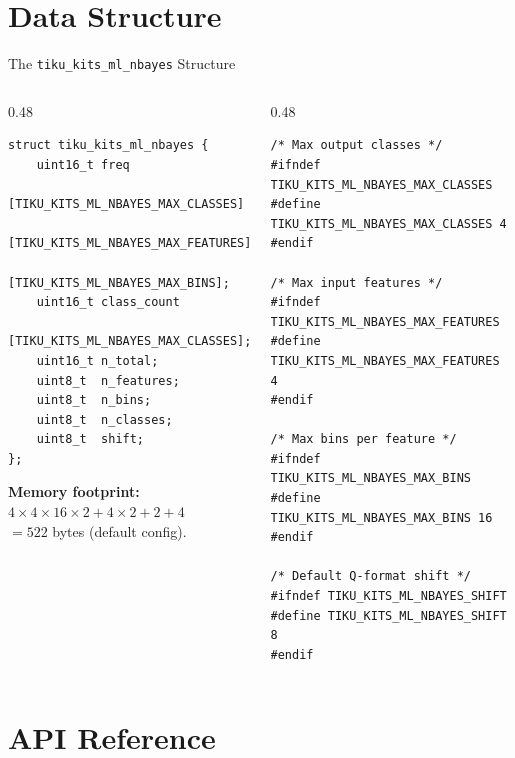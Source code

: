 \documentclass[aspectratio=169, 10pt]{beamer}
\begin{document}
\section{Data Structure}

\begin{frame}[fragile]{The \texttt{tiku\_kits\_ml\_nbayes} Structure}
\begin{columns}[T]
\begin{column}{0.48\textwidth}
\begin{lstlisting}[style=cstyle,
  title={ml/classification/tiku\_kits\_ml\_nbayes.h}]
struct tiku_kits_ml_nbayes {
    uint16_t freq
        [TIKU_KITS_ML_NBAYES_MAX_CLASSES]
        [TIKU_KITS_ML_NBAYES_MAX_FEATURES]
        [TIKU_KITS_ML_NBAYES_MAX_BINS];
    uint16_t class_count
        [TIKU_KITS_ML_NBAYES_MAX_CLASSES];
    uint16_t n_total;
    uint8_t  n_features;
    uint8_t  n_bins;
    uint8_t  n_classes;
    uint8_t  shift;
};
\end{lstlisting}

\textbf{Memory footprint:}\\
$4 \times 4 \times 16 \times 2 + 4 \times 2 + 2 + 4$\\
$= 522$ bytes (default config).
\end{column}

\begin{column}{0.48\textwidth}
\begin{lstlisting}[style=cstyle,
  title={Configuration macros}]
/* Max output classes */
#ifndef TIKU_KITS_ML_NBAYES_MAX_CLASSES
#define TIKU_KITS_ML_NBAYES_MAX_CLASSES 4
#endif

/* Max input features */
#ifndef TIKU_KITS_ML_NBAYES_MAX_FEATURES
#define TIKU_KITS_ML_NBAYES_MAX_FEATURES 4
#endif

/* Max bins per feature */
#ifndef TIKU_KITS_ML_NBAYES_MAX_BINS
#define TIKU_KITS_ML_NBAYES_MAX_BINS 16
#endif

/* Default Q-format shift */
#ifndef TIKU_KITS_ML_NBAYES_SHIFT
#define TIKU_KITS_ML_NBAYES_SHIFT 8
#endif
\end{lstlisting}
\end{column}
\end{columns}
\end{frame}

\section{API Reference}
\end{document}
